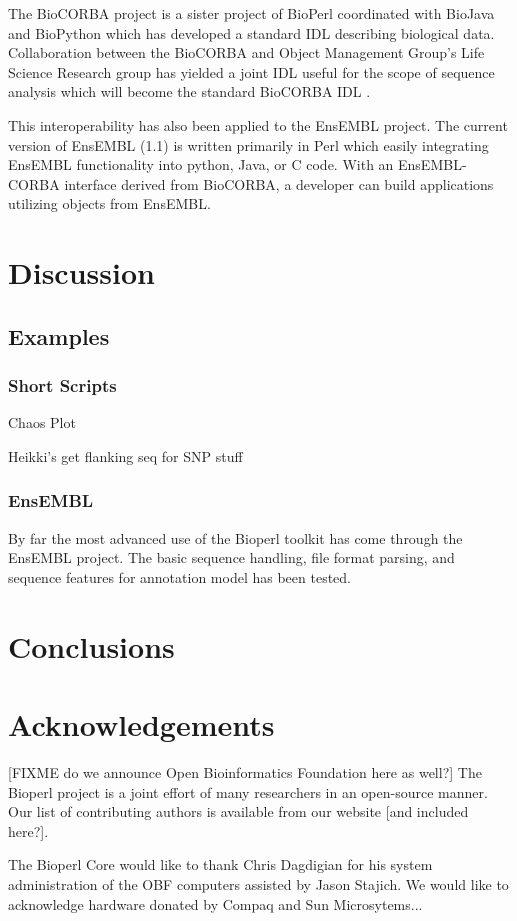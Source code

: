 \documentclass{article}
\begin{document}
\begin{twocolumn}
The BioCORBA project is a sister project of BioPerl coordinated with
BioJava and BioPython which has developed a standard IDL describing
biological data.  Collaboration between the BioCORBA and Object
Management Group's Life Science Research group has yielded a joint IDL
useful for the scope of sequence analysis which will become the
standard BioCORBA IDL \cite{biocorba}.

This interoperability has also been applied to the EnsEMBL project.
The current version of EnsEMBL (1.1) is written primarily in Perl
which easily integrating EnsEMBL functionality into python, Java, or C
code.  With an EnsEMBL-CORBA interface derived from BioCORBA, a
developer can build applications utilizing objects from EnsEMBL.

\section{Discussion}

\subsection{Examples}

\subsubsection{Short Scripts}
\begin{itemized}
\item Chaos Plot
\item Heikki's get flanking seq for SNP stuff
\end{itemized}

\subsubsection{EnsEMBL}

By far the most advanced use of the Bioperl toolkit has come through
the EnsEMBL project.  The basic sequence handling, file format
parsing, and sequence features for annotation model has been tested.


\section{Conclusions}


\section{Acknowledgements}

[FIXME do we announce Open Bioinformatics Foundation here as well?]
The Bioperl project is a joint effort of many researchers in an
open-source manner.  Our list of contributing authors is available
from our website [and included here?]. 

The Bioperl Core would like to thank Chris Dagdigian for his system
administration of the OBF computers assisted by Jason Stajich.  We
would like to acknowledge hardware donated by Compaq and Sun
Microsytems...


 

\end{twocolumn}
\end{document}
